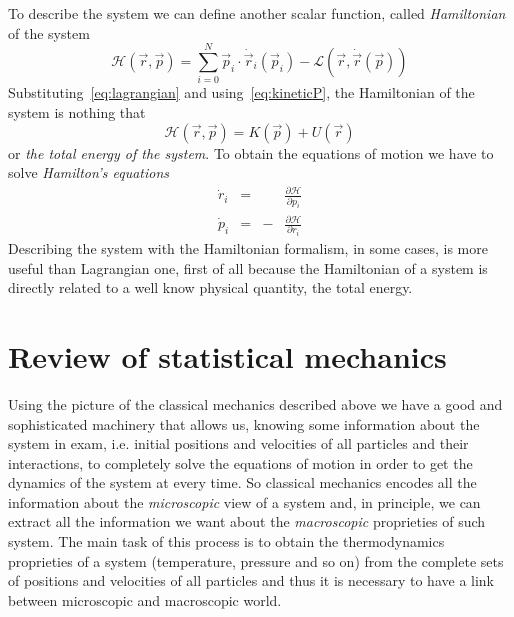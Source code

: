 To describe the system we can define another scalar function, called \textit{Hamiltonian} of the system
\begin{equation*}
	\mathcal{H}(\vec r, \vec p) = \sum_{i=0}^N \vec p_i \cdot \dot{\vec r}_i(\vec p_i) - \mathcal{L}(\vec r, \dot{\vec r}(\vec p))
\end{equation*}
Substituting~\eqref{eq:lagrangian} and using~\eqref{eq:kineticP}, the Hamiltonian of the system is nothing that
\begin{equation}
	\mathcal{H}(\vec r, \vec p) = K(\vec p) + U(\vec r)
	\label{eq:hamiltonian}
\end{equation}
or \textit{the total energy of the system}. To obtain the equations of motion we have to solve \textit{Hamilton's equations}
\begin{equation}
	\begin{aligned}
		\dot r_i &=& &\frac{\partial\mathcal{H}}{\partial p_{i}} \\
		\dot p_i &=&-&\frac{\partial\mathcal{H}}{\partial r_{i}}
	\end{aligned}
	\label{eq:eqhamilton}
\end{equation}
Describing the system with the Hamiltonian formalism, in some cases, is more useful than Lagrangian one, first of
all because the Hamiltonian of a system is directly related to a well know physical quantity, the total energy.

\section{Review of statistical mechanics}
\label{sec:statmec}
Using the picture of the classical mechanics described above we have a good and sophisticated machinery that
allows us, knowing some information about the system in exam, i.e. initial positions and velocities of all
particles and their interactions, to completely solve the equations of motion in order to get the dynamics of the
system at every time. So classical mechanics encodes all the information about the \textit{microscopic} view of a
system and, in principle, we can extract all the information we want about the \textit{macroscopic} proprieties
of such system. The main task of this process is to obtain the thermodynamics proprieties of a system
(temperature, pressure and so on) from the complete sets of positions and velocities of all particles and thus it
is necessary to have a link between microscopic and macroscopic world.

